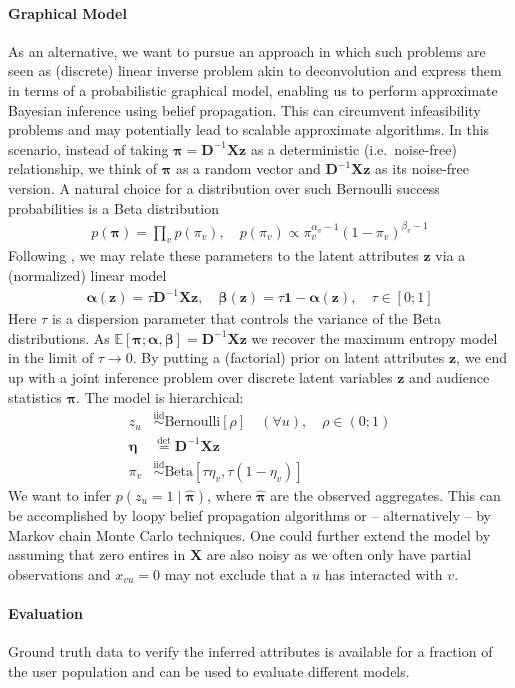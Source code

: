 \documentclass{article} %
\newcommand{\z}{{\mathbf z}}
\newcommand{\X}{{\mathbf X}}
\newcommand{\D}{{\mathbf D}}
\newcommand{\E}{{\mathbb E}}
\newcommand{\veta}{{\pmb \eta}}
\newcommand{\valpha}{{\pmb \alpha}}
\newcommand{\vbeta}{{\pmb \beta}}
\newcommand{\vpi}{{\pmb \pi}}
\begin{document}
\paragraph*{Graphical Model} As an alternative, we want to pursue an approach in which such problems are seen as (discrete) linear inverse problem akin to deconvolution and express them in terms of a probabilistic graphical model, enabling us to perform approximate Bayesian inference using belief propagation. This can circumvent infeasibility problems and may potentially lead to scalable approximate algorithms. In this scenario, instead of taking $\vpi = \D^{-1}\X\z$ as a deterministic (i.e.~noise-free) relationship, we think of $\vpi$ as a random vector and $\D^{-1}\X\z$ as its noise-free version. A natural choice for a distribution over such Bernoulli success probabilities is a Beta distribution 
\begin{align}
p(\vpi) = \prod_{v} p(\pi_v), \quad p(\pi_v) \propto \pi_v^{\alpha_v-1} (1-\pi_v)^{\beta_v-1}
\end{align}
Following \cite{ferrari2004beta}, we may relate these parameters to the latent attributes $\z$ via a (normalized) linear model
\begin{align}
\valpha(\z) = \tau  \D^{-1} \X \z, \quad \vbeta(\z) = \tau \mathbf 1 - \valpha(\z), \quad \tau \in [0;1]
\end{align}
Here $\tau$ is a dispersion parameter that controls the variance of the Beta distributions. As $\E[\vpi; \valpha, \vbeta] = \D^{-1} \X \z$ we recover the maximum entropy model in the limit of $\tau \to 0$. By putting a (factorial) prior on latent attributes $\z$, we end up with a joint inference problem over discrete latent variables $\z$ and audience statistics $\vpi$. The model is hierarchical:
\begin{align}
z_u  & \stackrel{\text{iid}}\sim \text{Bernoulli}[\rho] \quad (\forall u), \quad \rho \in (0;1)  \\
\veta & \stackrel{\text{det}}{=} \D^{-1} \X \z \\
\pi_v & \stackrel{\text{iid}}\sim \text{Beta}\left[\tau  \eta_v, \tau (1-\eta_v)\right]
\end{align}
We want to infer $p(z_u=1 \mid \hat \vpi)$, where $\hat \vpi$ are the observed aggregates. This can be accomplished by loopy belief propagation algorithms or -- alternatively -- by Markov chain Monte Carlo techniques. One could further extend the model by assuming that zero entires in $\X$ are also noisy as we often only have partial observations and $x_{vu}=0$ may not exclude that a $u$ has interacted with $v$. 

\paragraph*{Evaluation}

Ground truth data to verify the inferred attributes is available for a fraction of the user population and can be used to evaluate different models.



\end{document}
